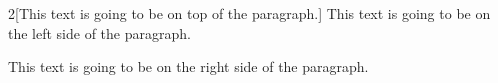 \begin{multicols}{2}[This text is going to be on top of the paragraph.]
	This text is going to be on the left side of the paragraph.

	\columnbreak

	This text is going to be on the right side of the paragraph.
\end{multicols}
